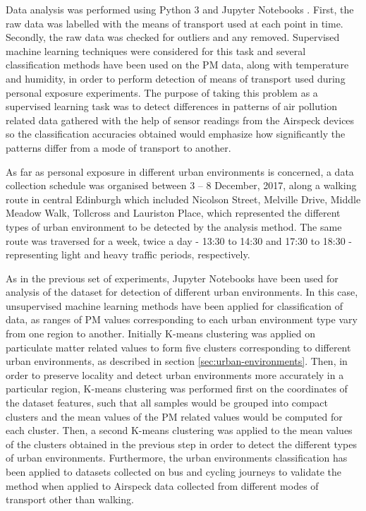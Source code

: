\documentclass[bsc,frontabs,twoside,singlespacing, parskip,deptreport]{infthesis}     %
\begin{document}
Data analysis was performed using Python 3 and Jupyter Notebooks \cite{jupyter}. First, the raw data was labelled with the means of transport used at each point in time. Secondly, the raw data was checked for outliers and any removed.  Supervised machine learning techniques were considered for this task and several classification methods have been used on the PM data, along with temperature and humidity, in order to perform detection of means of transport used during personal exposure experiments. The purpose of taking this problem as a supervised learning task was to detect differences in patterns of air pollution related data gathered with the help of sensor readings from the Airspeck devices so the classification accuracies obtained would emphasize how significantly the patterns differ from a mode of transport to another.

As far as personal exposure in different urban environments is concerned, a data collection schedule was organised between 3 – 8  December, 2017, along a walking route in central Edinburgh which included Nicolson Street, Melville Drive, Middle Meadow Walk, Tollcross and Lauriston Place,  which represented the different types of urban environment to be detected by the analysis method. The same route was traversed  for  a week, twice a day - 13:30 to 14:30 and 17:30 to 18:30 - representing light and heavy traffic periods, respectively.

As in the previous set of experiments, Jupyter Notebooks have been used for analysis of the dataset for detection of different urban environments. In this case, unsupervised machine learning methods have been applied for classification of data, as ranges of PM values corresponding to each urban environment type vary from one region to another. Initially K-means clustering was applied on particulate matter related values  to form five clusters corresponding to different urban environments, as described in section \ref{sec:urban-environments}. Then, in order to preserve locality and detect urban environments more accurately in a particular region, K-means clustering was performed first on the coordinates of the dataset features, such that all samples would be grouped into compact clusters and the mean values of the PM related values would be computed for each cluster. Then, a second K-means clustering was applied to the mean values of the clusters obtained in the previous step in order to detect the different types of urban environments. Furthermore, the  urban environments classification has been applied to datasets collected on bus and cycling  journeys  to validate the method when applied to Airspeck data collected from different modes of transport other than walking.
\end{document}
